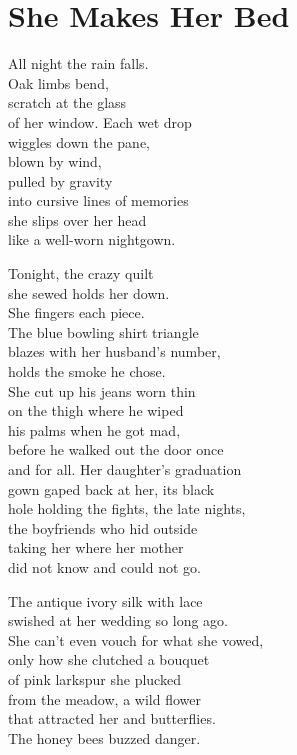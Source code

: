 \documentclass[twoside,10pt]{book}
\begin{document}
\clearpage
\section{She Makes Her Bed}

All night the rain falls.\\
Oak limbs bend,\\
scratch at the glass\\
of her window. Each wet drop\\
wiggles down the pane,\\
blown by wind,\\
pulled by gravity\\
into cursive lines of memories\\
she slips over her head\\
like a well-worn nightgown.

Tonight, the crazy quilt\\
she sewed holds her down.\\
She fingers each piece.\\
The blue bowling shirt triangle\\
blazes with her husband's number,\\
holds the smoke he chose.\\
She cut up his jeans worn thin\\
on the thigh where he wiped\\
his palms when he got mad,\\
before he walked out the door once\\
and for all. Her daughter's graduation\\
gown gaped back at her, its black\\
hole holding the fights, the late nights,\\
the boyfriends who hid outside\\
taking her where her mother\\
did not know and could not go.

The antique ivory silk with lace\\
swished at her wedding so long ago.\\
She can't even vouch for what she vowed,\\
only how she clutched a bouquet\\
of pink larkspur she plucked\\
from the meadow, a wild flower\\
that attracted her and butterflies.\\
The honey bees buzzed danger.
\end{document}
